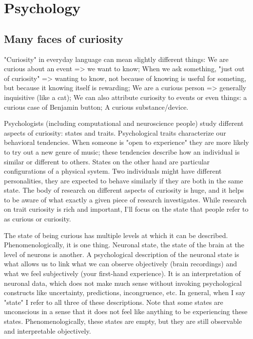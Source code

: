 \chapter{Psychology}\label{ch:psychology}

\section{Many faces of curiosity}

"Curiosity" in everyday language can mean slightly different things: We are curious about an event => we want to know;  When we ask something, "just out of curiosity" => wanting to know, not because of knowing is useful for someting, but because it knowing itself is rewarding; We are a curious person => generally inquisitive (like a cat); We can also attribute curiosity to events or even things: a curious case of Benjamin button; A curious substance/device. 

Psychologists (including computational and neuroscience people) study different aspects of curiosity: states and traits. Psychological traits characterize our behavioral tendencies. When someone is "open to experience" they are more likely to try out a new genre of music; these tendencies describe how an individual is similar or different to others. States on the other hand are particular configurations of a physical system. Two individuals might have different personalities, they are expected to behave similarly if they are both in the same state. The body of research on different aspects of curiosity is huge, and it helps to be aware of what exactly a given piece of research investigates. While research on trait curiosity is rich and important, I'll focus on the state that people refer to as curious or curiosity.

The state of being curious has multiple levels at which it can be described. Phenomenologically, it is one thing. Neuronal state, the state of the brain at the level of neurons is another. A psychological description of the neuronal state is what allows us to link what we can observe objectively (brain recordings) and what we feel subjectively (your first-hand experience). It is an interpretation of neuronal data, which does not make much sense without invoking psychological constructs like uncertainty, predictions, incongruence, etc. In general, when I say "state" I refer to all three of these descriptions. Note that some states are unconscious in a sense that it does not feel like anything to be experiencing these states. Phenomenologically, these states are empty, but they are still observable and interpretable objectively.

